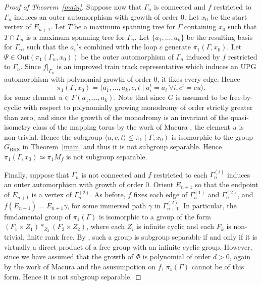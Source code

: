 \begin{proof}[Proof of Theorem~\ref{main}]
Suppose now that $\Gamma_{n}$ is connected and $f$ restricted to $\Gamma_n$ induces an outer automorphism with growth of order 0. Let $x_0$ be the start vertex of $E_{n+1}$. Let $T$ be a maximum spanning tree for $\Gamma$ containing $x_0$ such that $T \cap \Gamma_{n}$ is a maximum spanning tree for $\Gamma_n$. Let $\{a_1, \ldots, a_k\}$ be the resulting basis for $\Gamma_n$, such that the $a_i's$ combined with the loop $c$ generate $\pi_1(\Gamma, x_0)$.  Let $\Psi \in \mathrm{Out}(\pi_1(\Gamma_n, x_0))$ be the outer automorphism of $\Gamma_n$ induced by $f$ restricted to $\Gamma_n$. Since $f|_{\Gamma_n}$ is an improved train track representative which induces an UPG automorphism with polynomial growth of order 0, it fixes every edge. Hence%
\[\pi_1(\Gamma, x_0) = \langle a_1, \ldots, a_k, c , t \mid a_i^t = a_i\ \forall i, c^t = cu \rangle.\]
for some element $u \in F(a_1, \ldots, a_k)$. Note that since $G$ is assumed to be free-by-cyclic with respect to polynomially growing monodromy of order strictly greater than zero, and since the growth of the monodromy is an invariant of the quasi-isometry class of the mapping torus by the work of  Macura \cite{M}, the element $u$ is non-trivial. Hence the subgroup $\langle u, c, t \rangle \leq \pi_1(\Gamma, x_0)$ is isomorphic to the group $G_{\mathrm{BKS}}$ in Theorem~\ref{main} and thus it is not subgroup separable. Hence $\pi_1(\Gamma, x_0) \simeq \pi_1 M_f$ is not subgroup separable.

Finally, suppose that $\Gamma_n$ is not connected and $f$ restricted to each $\Gamma_n^{(i)}$ induces an outer automorphism with growth of order 0. Orient $E_{n+1}$ so that the endpoint of $E_{n+1}$ is a vertex of $\Gamma^{(2)}_{n}$. As before, $f$ fixes each edge of $\Gamma_n^{(1)}$ and $\Gamma_n^{(2)}$, and $f(E_{n+1}) = E_{n+1} \gamma$, for some immersed path $\gamma$ in $\Gamma_{n+1}^{(2)}$. In particular, the fundamental group of $\pi_1(\Gamma)$ is isomorphic to a group of the form $(F_1 \times Z_1) \ast_{Z_3} (F_2 \times Z_2)$, where each $Z_i$ is infinite cyclic and each $F_k$ is non-trivial, finite rank free. By \cite{NW}, such a group is subgroup separable if and only if it is virtually a direct product of a free group with an infinite cyclic group. However, since we have assumed that the growth of $\Phi$ is polynomial of order $d > 0$, again by the work of Macura \cite{M} and the asusumpotion on $f$, $\pi_1(\Gamma)$ cannot be of this form. Hence it is not subgroup separable. \end{proof}
